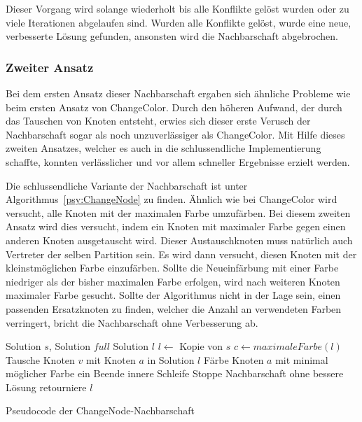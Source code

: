 Dieser Vorgang wird solange wiederholt bis alle Konflikte gelöst wurden oder zu viele Iterationen abgelaufen sind. Wurden alle Konflikte gelöst, wurde eine neue, verbesserte Lösung gefunden, ansonsten wird die Nachbarschaft abgebrochen.

\subsubsection{Zweiter Ansatz}

Bei dem ersten Ansatz dieser Nachbarschaft ergaben sich ähnliche Probleme wie beim ersten Ansatz von ChangeColor. Durch den höheren Aufwand, der durch das Tauschen von Knoten entsteht, erwies sich dieser erste Verusch der Nachbarschaft
sogar als noch unzuverlässiger als ChangeColor. Mit Hilfe dieses zweiten Ansatzes, welcher es auch in die schlussendliche Implementierung schaffte, konnten verlässlicher und vor allem schneller Ergebnisse erzielt werden.

Die schlussendliche Variante der Nachbarschaft ist unter Algorithmus~\ref{psy:ChangeNode} zu finden. Ähnlich wie bei ChangeColor wird versucht, alle Knoten mit der maximalen Farbe umzufärben. Bei diesem zweiten Ansatz wird dies versucht, indem
ein Knoten mit maximaler Farbe gegen einen anderen Knoten ausgetauscht wird. Dieser Austauschknoten muss natürlich auch Vertreter der selben Partition sein. Es wird dann versucht, diesen Knoten mit der kleinstmöglichen Farbe einzufärben. Sollte die Neueinfärbung mit einer Farbe niedriger als der bisher maximalen Farbe erfolgen, wird nach weiteren Knoten maximaler Farbe gesucht. Sollte der Algorithmus nicht in der Lage sein, einen
passenden Ersatzknoten zu finden, welcher die Anzahl an verwendeten Farben verringert, bricht die Nachbarschaft ohne Verbesserung ab.

\begin{algorithm}
\begin{algorithmic}[1]
\Require Solution $s$, Solution $full$
\Ensure Solution $l$
\State $l \leftarrow$ Kopie von $s$
\State $c \leftarrow maximaleFarbe(l)$
\State Tausche Knoten $v$ mit Knoten $a$ in Solution $l$
\State Färbe Knoten $a$ mit minimal möglicher Farbe ein
\State Beende innere Schleife
\EndIf
\EndFor
{}
\State Stoppe Nachbarschaft ohne bessere Lösung
\EndIf
\EndFor
\State retourniere $l$
\end{algorithmic}
\caption{Pseudocode der ChangeNode-Nachbarschaft}
\label{psy:ChangeNode}
\end{algorithm}

